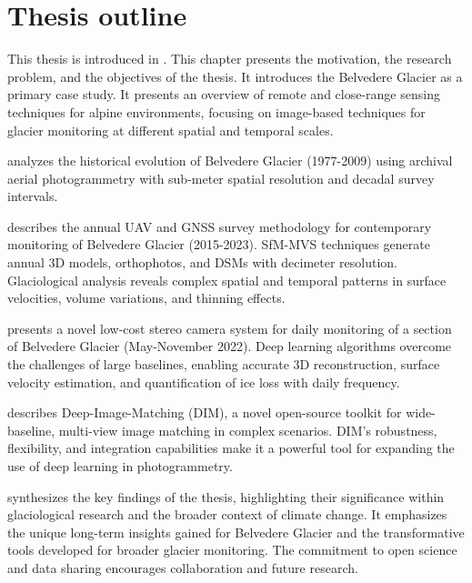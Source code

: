 \section{Thesis outline}

This thesis is introduced in \textbf{}. 
This chapter presents the motivation, the research problem, and the objectives of the thesis.
It introduces the Belvedere Glacier as a primary case study. It presents an overview of remote and close-range sensing techniques for alpine environments, focusing on image-based techniques for glacier monitoring at different spatial and temporal scales.

\textbf{} analyzes the historical evolution of Belvedere Glacier (1977-2009) using archival aerial photogrammetry with sub-meter spatial resolution and decadal survey intervals.

\textbf{} describes the annual UAV and GNSS survey methodology for contemporary monitoring of Belvedere Glacier (2015-2023).  
SfM-MVS techniques generate annual 3D models, orthophotos, and DSMs with decimeter resolution.
Glaciological analysis reveals complex spatial and temporal patterns in surface velocities, volume variations, and thinning effects.

\textbf{} presents a novel low-cost stereo camera system for daily monitoring of a section of Belvedere Glacier (May-November 2022).
Deep learning algorithms overcome the challenges of large baselines, enabling accurate 3D reconstruction, surface velocity estimation, and quantification of ice loss with daily frequency. 

\textbf{} describes Deep-Image-Matching (DIM), a novel open-source toolkit for wide-baseline, multi-view image matching in complex scenarios. 
DIM's robustness, flexibility, and integration capabilities make it a powerful tool for expanding the use of deep learning in photogrammetry. 

\textbf{} synthesizes the key findings of the thesis, highlighting their significance within glaciological research and the broader context of climate change.  
It emphasizes the unique long-term insights gained for Belvedere Glacier and the transformative tools developed for broader glacier monitoring. 
The commitment to open science and data sharing encourages collaboration and future research.

\makechapterbibliography{}
